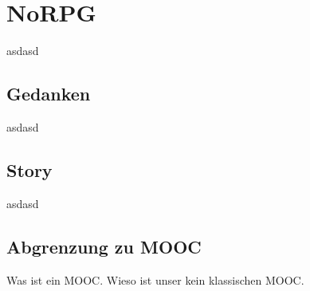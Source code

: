 \chapter{NoRPG}
	asdasd
	
\section{Gedanken}
	asdasd
	
\section{Story}
	asdasd
	
\section{Abgrenzung zu MOOC}
	Was ist ein MOOC. Wieso ist unser kein klassischen MOOC.